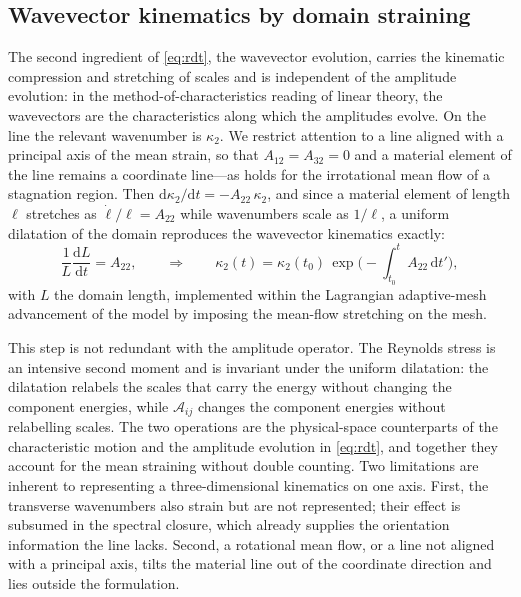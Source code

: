 \documentclass[11pt,a4paper]{article}
\begin{document}
\subsection{Wavevector kinematics by domain straining}
\label{sec:domain-strain}

The second ingredient of \eqref{eq:rdt}, the wavevector evolution, carries
the kinematic compression and stretching of scales and is independent of
the amplitude evolution: in the method-of-characteristics reading of
linear theory, the wavevectors are the characteristics along which the
amplitudes evolve. On the line the relevant wavenumber is $\kappa_2$. We
restrict attention to a line aligned with a principal axis of the mean
strain, so that $A_{12}=A_{32}=0$ and a material element of the line
remains a coordinate line---as holds for the irrotational mean flow of a
stagnation region. Then
$\mathrm{d}\kappa_2/\mathrm{d}t=-A_{22}\,\kappa_2$, and since a material
element of length $\ell$ stretches as $\dot\ell/\ell=A_{22}$ while
wavenumbers scale as $1/\ell$, a uniform dilatation of the domain
reproduces the wavevector kinematics exactly:
\begin{equation}
  \frac{1}{L}\frac{\mathrm{d}L}{\mathrm{d}t}=A_{22},
  \qquad\Longrightarrow\qquad
  \kappa_2(t)=\kappa_2(t_0)\,
  \exp\!\Big(\!-\!\int_{t_0}^{t}A_{22}\,\mathrm{d}t'\Big),
  \label{eq:dilatation}
\end{equation}
with $L$ the domain length, implemented within the Lagrangian
adaptive-mesh advancement of the model \citep{Lignell2013} by imposing
the mean-flow stretching on the mesh.

This step is not redundant with the amplitude operator. The Reynolds
stress is an intensive second moment and is invariant under the uniform
dilatation: the dilatation relabels the scales that carry the energy
without changing the component energies, while $\mathcal{A}_{ij}$ changes
the component energies without relabelling scales. The two operations are
the physical-space counterparts of the characteristic motion and the
amplitude evolution in \eqref{eq:rdt}, and together they account for the
mean straining without double counting. Two limitations are inherent to
representing a three-dimensional kinematics on one axis. First, the
transverse wavenumbers also strain but are not represented; their
effect is subsumed in the spectral closure, which already supplies the
orientation information the line lacks. Second, a rotational mean flow,
or a line not aligned with a principal axis, tilts the material line
out of the coordinate direction and lies outside the formulation.
\end{document}
